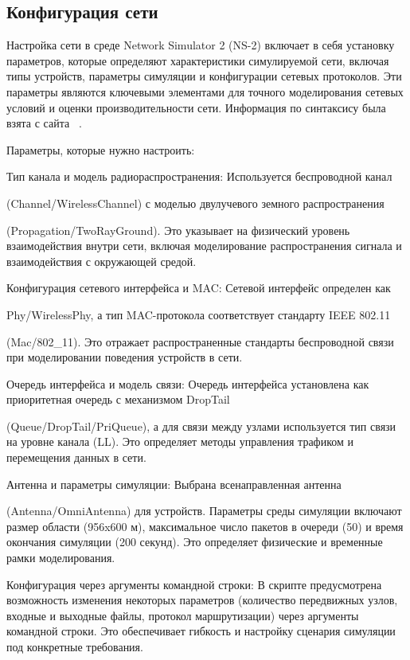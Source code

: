 \subsection*{Конфигурация сети}

Настройка сети в среде Network Simulator 2 (NS-2) включает в себя установку параметров, которые определяют характеристики симулируемой сети, включая типы устройств, параметры симуляции и конфигурации сетевых протоколов. Эти параметры являются ключевыми элементами для точного моделирования сетевых условий и оценки производительности сети. Информация по синтаксису была взята с сайта ~\cite{ns2_docs}.

Параметры, которые нужно настроить:

Тип канала и модель радиораспространения:
Используется беспроводной канал 

(Channel/WirelessChannel) с моделью двулучевого земного распространения

(Propagation/TwoRayGround). Это указывает на физический уровень взаимодействия внутри сети, включая моделирование распространения сигнала и взаимодействия с окружающей средой.

Конфигурация сетевого интерфейса и MAC:
Сетевой интерфейс определен как 

Phy/WirelessPhy, а тип MAC-протокола соответствует стандарту IEEE 802.11 

(Mac/802\_11). Это отражает распространенные стандарты беспроводной связи при моделировании поведения устройств в сети.

Очередь интерфейса и модель связи: 
Очередь интерфейса установлена как приоритетная очередь с механизмом DropTail 

(Queue/DropTail/PriQueue), а для связи между узлами используется тип связи на уровне канала (LL). 
Это определяет методы управления трафиком и перемещения данных в сети.

Антенна и параметры симуляции: 
Выбрана всенаправленная антенна 

(Antenna/OmniAntenna) для устройств. Параметры среды симуляции включают размер области (956x600 м), максимальное число пакетов в очереди (50) 
и время окончания симуляции (200 секунд). Это определяет физические и временные рамки моделирования.

Конфигурация через аргументы командной строки: В скрипте предусмотрена возможность изменения некоторых параметров (количество передвижных узлов, входные и выходные файлы, протокол маршрутизации) через аргументы командной строки. Это обеспечивает гибкость и настройку сценария симуляции под конкретные требования.

